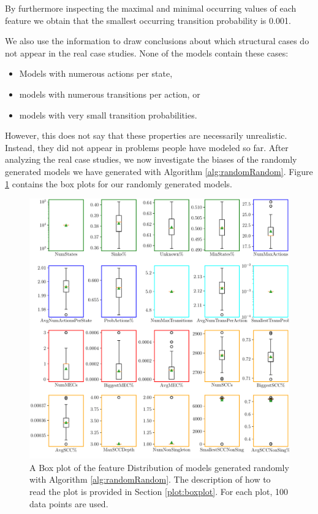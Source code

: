 By furthermore inspecting the maximal and minimal occurring values of each feature we obtain that the smallest occurring transition probability is 0.001.

We also use the information to draw conclusions about which structural cases do not appear in the real case studies. 
None of the models contain these cases:
\begin{itemize}
    \item Models with numerous actions per state,
    \item models with numerous transitions per action, or
    \item models with very small transition probabilities.
\end{itemize}
\FloatBarrier
However, this does not say that these properties are necessarily unrealistic. Instead, they did not appear in problems people have modeled so far.
After analyzing the real case studies, we now investigate the biases of the randomly generated models we have generated with Algorithm \ref{alg:randomRandom}.
Figure \ref{fig:Random_FeatureDistribution} contains the box plots for our randomly generated models. 
\begin{figure}[h!]
    \centering
    \includegraphics[width=1\textwidth]{figures/RandomRandom_FeatureDistribution.pdf}
    \caption[Feature Distribution of randomly generated models]{
        A Box plot of the feature Distribution of models generated randomly with Algorithm \ref{alg:randomRandom}. The description of how to read the plot is provided in Section \ref{plot:boxplot}.
        For each plot, 100 data points are used.
    }
    \label{fig:Random_FeatureDistribution}
\end{figure}
 
